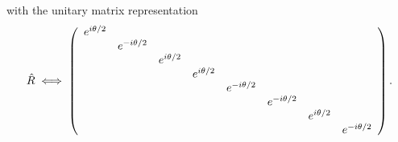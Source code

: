 \documentclass{../mathnotes}
\begin{document}
with the unitary matrix representation
\begin{align*}
    \hat R \iff
    \left(
    \begin{array}[]{cccccccc}
        e^{i\theta/2} &  &  &  &  &  &  & \\
         & e^{-i\theta/2} &  &  &  &  &  & \\
         &  & e^{i\theta/2} &  &  &  &  & \\
         &  &  & e^{i\theta/2} &  &  &  & \\
         &  &  &  & e^{-i\theta/2} &  &  & \\
         &  &  &  &  & e^{-i\theta/2} &  & \\
         &  &  &  &  &  & e^{i\theta/2} & \\
         &  &  &  &  &  &  & e^{-i\theta/2}\\
    \end{array}
    \right).
\end{align*}
\end{document}
